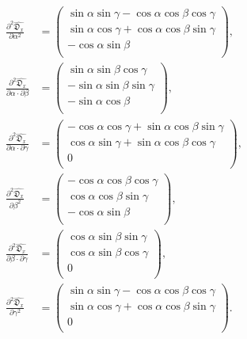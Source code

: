 \documentclass[a4paper,11pt,twoside,openright]{book}
\def\lthtmlcheckvsize{\ifdim\ht\sizebox<\vsize 
  \ifdim\wd\sizebox<\hsize\expandafter\hfill\fi \expandafter\vfill
  \else\expandafter\vss\fi}%
\begin{document}
{\newpage\clearpage
\setcounter{equation}{177}
%
\begin{subequations}\begin{align}
\frac{\partial^2 \widehat{\mathfrak{D}_x}}{\partial \alpha^2} &= \begin{pmatrix}
\sin \alpha \sin \gamma - \cos \alpha \cos \beta \cos \gamma \\
\sin \alpha \cos \gamma + \cos \alpha \cos \beta \sin \gamma \\
-\cos \alpha \sin \beta \\
\end{pmatrix}, \\
\frac{\partial^2 \widehat{\mathfrak{D}_x}}{\partial \alpha \cdot \partial \beta} &= \begin{pmatrix}
\sin \alpha \sin \beta \cos \gamma \\
- \sin \alpha \sin \beta \sin \gamma \\
-\sin \alpha \cos \beta \\
\end{pmatrix}, \\
\frac{\partial^2 \widehat{\mathfrak{D}_x}}{\partial \alpha \cdot \partial \gamma} &= \begin{pmatrix}
-\cos \alpha \cos \gamma + \sin \alpha \cos \beta \sin \gamma \\
\cos \alpha \sin \gamma + \sin \alpha \cos \beta \cos \gamma \\
0 \\
\end{pmatrix}, \\
\frac{\partial^2 \widehat{\mathfrak{D}_x}}{\partial \beta^2} &= \begin{pmatrix}
-\cos \alpha \cos \beta \cos \gamma \\
\cos \alpha \cos \beta \sin \gamma \\
-\cos \alpha \sin \beta \\
\end{pmatrix}, \\
\frac{\partial^2 \widehat{\mathfrak{D}_x}}{\partial \beta \cdot \partial \gamma} &= \begin{pmatrix}
\cos \alpha \sin \beta \sin \gamma \\
\cos \alpha \sin \beta \cos \gamma \\
0 \\
\end{pmatrix}, \\
\frac{\partial^2 \widehat{\mathfrak{D}_x}}{\partial \gamma^2} &= \begin{pmatrix}
\sin \alpha \sin \gamma - \cos \alpha \cos \beta \cos \gamma \\
\sin \alpha \cos \gamma + \cos \alpha \cos \beta \sin \gamma \\
0 \\
\end{pmatrix}.
\end{align}\end{subequations}%
\lthtmldisplayZ
\lthtmlcheckvsize\clearpage}
\end{document}
